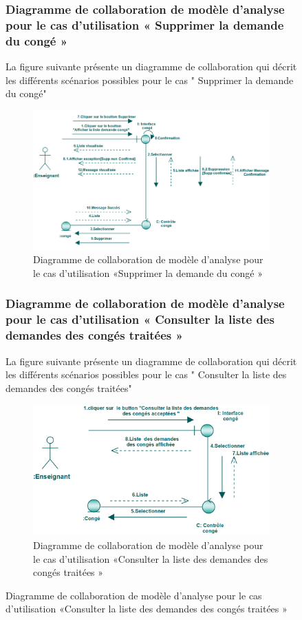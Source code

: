 \documentclass[12 pt]{report}
\begin{document}
\begin{figure}[h]
\begin{center}
\subsubsection{Diagramme  de  collaboration  de  modèle  d'analyse  pour  le  cas  d'utilisation « Supprimer  la demande du  congé »  }
La figure suivante présente un diagramme de collaboration qui décrit les différents
scénarios possibles pour le cas " Supprimer  la demande du  congé"
\begin{figure}[h]
\begin{center}
\includegraphics[width= 14cm , height =5 cm]{colla_ens_supprimerdemandeconge.png}
 \caption{Diagramme  de  collaboration  de  modèle  d'analyse  pour  le  cas  d'utilisation «Supprimer  la demande du congé »}
\end{center}
\end{figure}
\subsubsection{Diagramme  de  collaboration  de  modèle  d'analyse  pour  le  cas  d'utilisation « Consulter la liste des demandes des congés traitées »  }
La figure suivante présente un diagramme de collaboration qui décrit les différents
scénarios possibles pour le cas " Consulter la liste des demandes des congés traitées"
\begin{figure}[h]
\begin{center}
\includegraphics[width= 14cm , height =5 cm]{collaconscon.PNG}
 \caption{Diagramme  de  collaboration  de  modèle  d'analyse  pour  le  cas  d'utilisation «Consulter la liste des demandes des congés traitées »}
\end{center}
\end{figure}

\end{center}
\end{figure}
\end{document}
